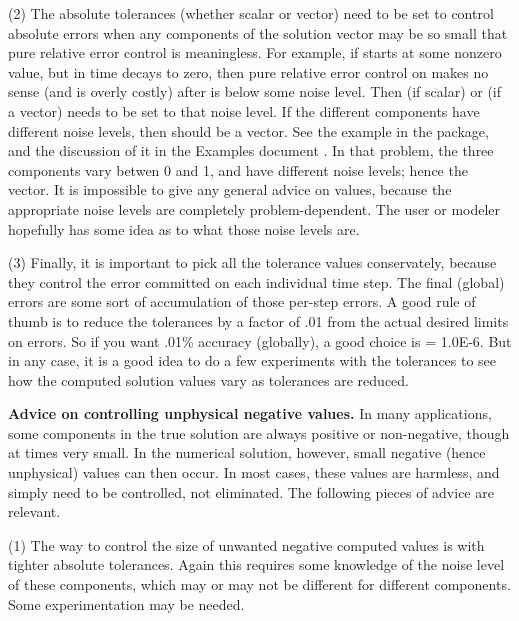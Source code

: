 (2) The absolute tolerances  (whether scalar or vector) need to
be set to control absolute errors when any components of the solution
vector  may be so small that pure relative error control is
meaningless.  For example, if  starts at some nonzero value, but in time
decays to zero, then pure relative error control on  makes no sense
(and is overly costly) after  is below some noise level.  Then
 (if scalar) or  (if a vector) needs to be set to that
noise level.  If the different components have different noise levels,
then  should be a vector.  See the example  in the
{\cvode} package, and the discussion of it in the {\cvode} Examples document
\cite{cvode2.4.0_ex}.
In that problem, the three components vary betwen 0 and 1, and have
different noise levels; hence the  vector.  It is impossible to
give any general advice on  values, because the appropriate noise
levels are completely problem-dependent.  The user or modeler hopefully has
some idea as to what those noise levels are.

(3) Finally, it is important to pick all the tolerance values conservately,
because they control the error committed on each individual time step.
The final (global) errors are some sort of accumulation of those
per-step errors.  A good rule of thumb is to reduce the tolerances by a
factor of .01 from the actual desired limits on errors.  So if you
want .01\% accuracy (globally), a good choice is  = 1.0E-6.
But in any case, it is a good idea to do a few experiments with
the tolerances to see how the computed solution values vary as
tolerances are reduced.

\vspace{0.1in}
{\bf Advice on controlling unphysical negative values.}
In many applications, some components in the true solution are always
positive or non-negative, though at times very small.  In the numerical
solution, however, small negative (hence unphysical) values can then
occur.  In most cases, these values are harmless, and simply need to
be controlled, not eliminated. The following pieces of advice are relevant.

(1) The way to control the size of unwanted negative computed values
is with tighter absolute tolerances.  Again this requires some
knowledge of the noise level of these components, which may or may not
be different for different components.  Some experimentation may be
needed.

